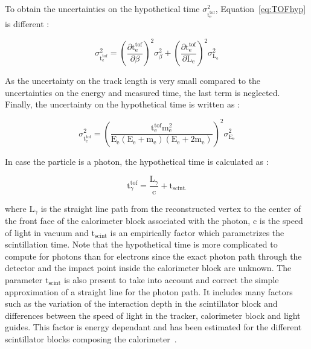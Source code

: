 \documentclass[main.tex]{subfiles}
\begin{document}
\bigskip


\NI To obtain the uncertainties on the hypothetical time $\sigma^\text{2}_{\text{t}_{\text{e}}^{\text{tof}}}$, Equation~\ref{eq:TOFhyp} is different : 


\begin{equation}
\sigma^\text{2}_{\text{t}_{\text{e}}^{\text{tof}}} = \left( \frac{\partial \text{t}_\text{e}^{\text{tof}}}{\partial \beta}  \right)^\text{2} \sigma^\text{2}_\beta + \left( \frac{\partial \text{t}_\text{e}^{\text{tof}}}{\partial \text{L}_\text{e}}  \right)^\text{2} \sigma^\text{2}_{\text{L}_\text{e}}
\end{equation}


\bigskip


\NI As the uncertainty on the track length is very small compared to the uncertainties on the energy and measured time, the last term is neglected. Finally, the uncertainty on the hypothetical time is written as : 


\begin{equation}
\sigma^\text{2}_{\text{t}_{\text{e}}^{\text{tof}}} = \left( \frac{\text{t}_\text{e}^{\text{tof}} \text{m}_\text{e}^\text{2}}{\text{E}_\text{e} (\text{E}_\text{e} + \text{m}_\text{e})(\text{E}_\text{e} + \text{2m}_\text{e})}  \right) ^\text{2} \sigma^\text{2}_{\text{E}_\text{e}}
\end{equation}


\bigskip


\NI In case the particle is a photon, the hypothetical time is calculated as : 


\begin{equation}
\text{t}_\gamma^{\text{tof}} = \frac{\text{L}_\gamma}{\text{c}} + \text{t}_{\text{scint.}} 
\end{equation}

\bigskip


\NI where L$_{\gamma}$ is the straight line path from the reconstructed vertex to the center of the front face of the calorimeter block associated with the photon, c is the speed of light in vacuum and t$_{\text{scint}}$ is an empirically factor which parametrizes the scintillation time. Note that the hypothetical time is more complicated to compute for photons than for electrons since the exact photon path through the detector and the impact point inside the calorimeter block are unknown. The parameter t$_{\text{scint}}$ is also present to take into account and correct the simple approximation of a straight line for the photon path. It includes many factors such as the variation of the interaction depth in the scintillator block and differences between the speed of light in the tracker, calorimeter block and light guides. This factor is energy dependant and has been estimated for the different scintillator blocks composing the calorimeter~\cite{GammaReconstructionHereward}.
\end{document}
